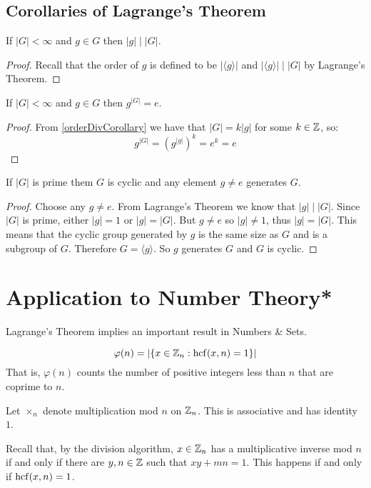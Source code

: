 \documentclass[../main.tex]{subfiles}
\begin{document}
\subsection{Corollaries of Lagrange's Theorem}
\begin{corollary}
  If $|G| < \infty$ and $g \in G$ then $|g| \mid |G|$.
  \label{orderDivCorollary}
\end{corollary}
\begin{proof}
  Recall that the order of $g$ is defined to be $|\langle g \rangle|$ and $|\langle g \rangle| \mid |G|$ by Lagrange's Theorem.
\end{proof}
\begin{corollary}
  If $|G| < \infty$ and $g \in G$ then $g^{|G|} = e$.
  \label{groupOrderPower}
\end{corollary}
\begin{proof}
  From \cref{orderDivCorollary} we have that $|G| = k |g|$ for some $k \in \mathbb{Z}$, so:
  \[
    g^{|G|} = (g^{|g|})^{k} = e^{k} = e
  \]
\end{proof}
\begin{corollary}
  If $|G|$ is prime them $G$ is cyclic and any element $g \neq e$ generates $G$.
\end{corollary}
\begin{proof}
  Choose any $g \neq e$.
  From Lagrange's Theorem we know that $|g| \mid |G|$.
  Since $|G|$ is prime, either $|g| = 1$ or $|g| = |G|$.
  But $g \neq e$ so $|g| \neq 1$, thus $|g| = |G|$.
  This means that the cyclic group generated by $g$ is the same size as $G$ and is a subgroup of $G$.
  Therefore $G = \langle g \rangle$.
  So $g$ generates $G$ and $G$ is cyclic.
\end{proof}
\section{Application to Number Theory*}
\nonexaminable
Lagrange's Theorem implies an important result in Numbers \& Sets.
\begin{definition}
  \[
    \varphi(n) = |\{x \in \mathbb{Z}_n : \operatorname{hcf}(x, n) = 1\}|
  \]
  That is, $\varphi(n)$ counts the number of positive integers less than $n$ that are coprime to $n$.
\end{definition}
\begin{remark}[Notation]
  Let $\times_n$ denote multiplication mod $n$ on $\mathbb{Z}_n$.
  This is associative and has identity $1$.
\end{remark}
Recall that, by the division algorithm, $x \in \mathbb{Z}_n$ has a multiplicative inverse mod $n$ if and only if there are $y, n \in \mathbb{Z}$ such that $xy + mn = 1$.
This happens if and only if $\operatorname{hcf}(x, n) = 1$.
\end{document}
